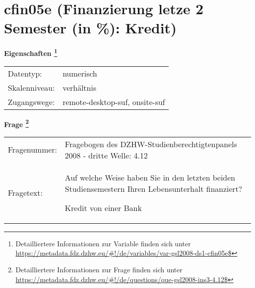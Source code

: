 
    \setcounter{footnote}{0}

    \vspace*{-1.8cm}
	\section{cfin05e (Finanzierung letze 2 Semester (in \%): Kredit)}
	\label{section:cfin05e}



    \vspace*{0.5cm}
    \noindent\textbf{Eigenschaften
	\footnote{Detailliertere Informationen zur Variable finden sich unter
		\url{https://metadata.fdz.dzhw.eu/\#!/de/variables/var-gsl2008-ds1-cfin05e$}}}\\
	\begin{tabularx}{\hsize}{@{}lX}
	Datentyp: & numerisch \\
	Skalenniveau: & verhältnis \\
	Zugangswege: &
	  remote-desktop-suf, 
	  onsite-suf
 \\
    \end{tabularx}



				\vspace*{0.5cm}
                \noindent\textbf{Frage
	                \footnote{Detailliertere Informationen zur Frage finden sich unter
		              \url{https://metadata.fdz.dzhw.eu/\#!/de/questions/que-gsl2008-ins3-4.12$}}}\\
				\begin{tabularx}{\hsize}{@{}lX}
					Fragenummer: &
					  Fragebogen des DZHW-Studienberechtigtenpanels 2008 - dritte Welle:
					  4.12
 \\
					Fragetext: & Auf welche Weise haben Sie in den letzten beiden Studiensemestern Ihren Lebensunterhalt finanziert?\par  Kredit von einer Bank \\
				\end{tabularx}





